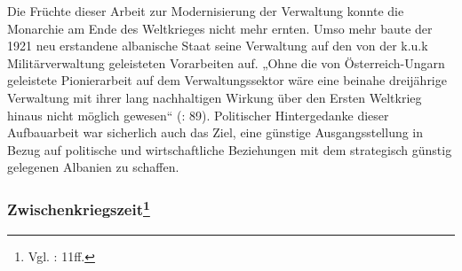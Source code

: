 Die Früchte dieser Arbeit zur Modernisierung der Verwaltung konnte die Monarchie am Ende des Weltkrieges nicht mehr ernten. Umso mehr baute der 1921 neu erstandene albanische Staat seine Verwaltung auf den von der k.u.k Militärverwaltung geleisteten Vorarbeiten auf. „Ohne die von Österreich-Ungarn geleistete Pionierarbeit auf dem Verwaltungssektor wäre eine beinahe dreijährige Verwaltung mit ihrer lang nachhaltigen Wirkung über den Ersten Weltkrieg hinaus nicht möglich gewesen“ (\cite{schwanke}: 89). Politischer Hintergedanke dieser Aufbauarbeit war sicherlich auch das Ziel, eine günstige Ausgangsstellung in Bezug auf politische und wirtschaftliche Beziehungen mit dem strategisch günstig gelegenen Albanien zu schaffen.

\subsubsection[Zwischenkriegszeit]{Zwischenkriegszeit\footnote{Vgl. \cite{vollmer07}: 11ff.}}

